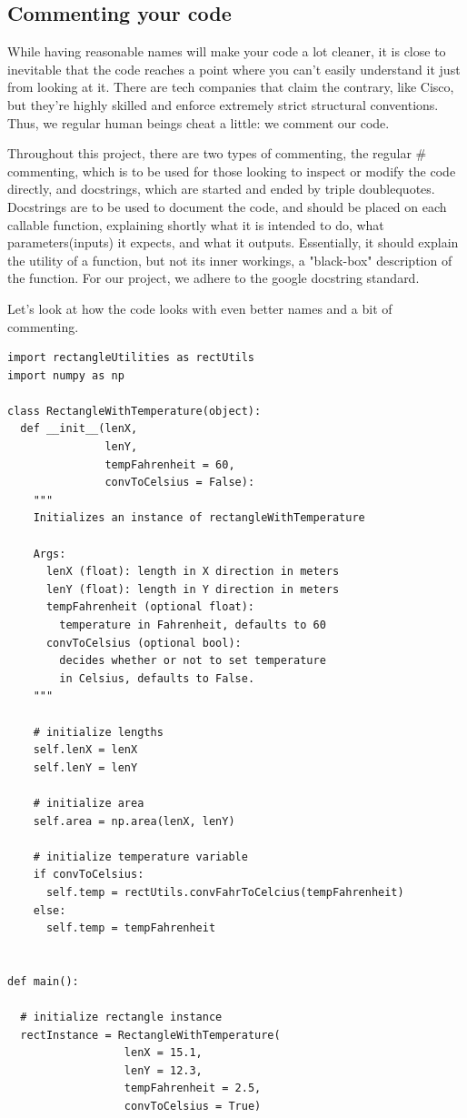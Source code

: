 \documentclass[10pt,a4paper]{article}
\begin{document}
\subsection{Commenting your code}
While having reasonable names will make your code a lot cleaner, it is close to inevitable that the code reaches a point where you can't easily understand it just from looking at it. There are tech companies that claim the contrary, like Cisco, but they're highly skilled and enforce extremely strict structural conventions. Thus, we regular human beings cheat a little: we comment our code. 

Throughout this project, there are two types of commenting, the regular \# commenting, which is to be used for those looking to inspect or modify the code directly, and docstrings, which are started and ended by triple doublequotes. Docstrings are to be used to document the code, and should be placed on each callable function, explaining shortly what it is intended to do, what parameters(inputs) it expects, and what it outputs. Essentially, it should explain the utility of a function, but not its inner workings, a "black-box" description of the function. For our project, we adhere to the google docstring standard.

Let's look at how the code looks with even better names and a bit of commenting.  

\begin{lstlisting}
import rectangleUtilities as rectUtils
import numpy as np

class RectangleWithTemperature(object):
  def __init__(lenX, 
               lenY, 
               tempFahrenheit = 60, 
               convToCelsius = False):
    """
    Initializes an instance of rectangleWithTemperature
    
    Args: 
      lenX (float): length in X direction in meters
      lenY (float): length in Y direction in meters
      tempFahrenheit (optional float): 
        temperature in Fahrenheit, defaults to 60
      convToCelsius (optional bool): 
        decides whether or not to set temperature 
        in Celsius, defaults to False.
    """
    
    # initialize lengths
    self.lenX = lenX
    self.lenY = lenY
    
    # initialize area
    self.area = np.area(lenX, lenY)
	
    # initialize temperature variable
    if convToCelsius:
      self.temp = rectUtils.convFahrToCelcius(tempFahrenheit)
    else:
      self.temp = tempFahrenheit
    

def main():

  # initialize rectangle instance
  rectInstance = RectangleWithTemperature(
                  lenX = 15.1, 
                  lenY = 12.3, 
                  tempFahrenheit = 2.5, 
                  convToCelsius = True)
	
\end{lstlisting}
\end{document}

